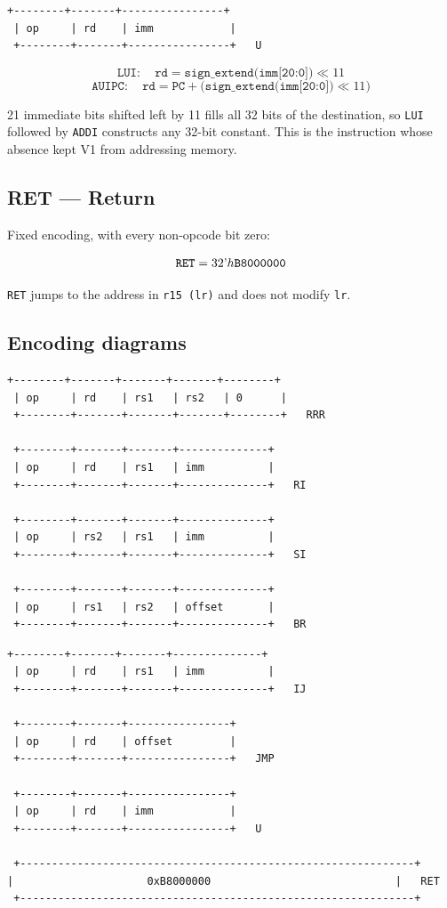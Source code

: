 \documentclass[11pt,a4paper]{article}
\begin{document}
\begin{lstlisting}[style=Bits]
 +--------+-------+----------------+
 | op     | rd    | imm            |
 +--------+-------+----------------+   U
\end{lstlisting}

\[
\texttt{LUI}: \quad \texttt{rd} = \texttt{sign\_extend(imm[20:0])} \ll 11
\]
\[
\texttt{AUIPC}: \quad \texttt{rd} = \texttt{PC} + \big(\texttt{sign\_extend(imm[20:0])} \ll 11\big)
\]

21 immediate bits shifted left by 11 fills all 32 bits of the destination, so
\texttt{LUI} followed by \texttt{ADDI} constructs any 32-bit constant. This is
the instruction whose absence kept V1 from addressing memory.

\subsection{RET --- Return}

Fixed encoding, with every non-opcode bit zero:

\[
\texttt{RET} = 32\textrm{\textquoteright}h\texttt{B8000000}
\]

\texttt{RET} jumps to the address in \texttt{r15 (lr)} and does not modify
\texttt{lr}.

\newpage

\subsection{Encoding diagrams}

\begin{lstlisting}[style=Bits]
 +--------+-------+-------+-------+--------+
 | op     | rd    | rs1   | rs2   | 0      |
 +--------+-------+-------+-------+--------+   RRR

 +--------+-------+-------+--------------+
 | op     | rd    | rs1   | imm          |
 +--------+-------+-------+--------------+   RI

 +--------+-------+-------+--------------+
 | op     | rs2   | rs1   | imm          |
 +--------+-------+-------+--------------+   SI

 +--------+-------+-------+--------------+
 | op     | rs1   | rs2   | offset       |
 +--------+-------+-------+--------------+   BR
\end{lstlisting}

\begin{lstlisting}[style=Bits]
 +--------+-------+-------+--------------+
 | op     | rd    | rs1   | imm          |
 +--------+-------+-------+--------------+   IJ

 +--------+-------+----------------+
 | op     | rd    | offset         |
 +--------+-------+----------------+   JMP

 +--------+-------+----------------+
 | op     | rd    | imm            |
 +--------+-------+----------------+   U

 +--------------------------------------------------------------+
|                     0xB8000000                             |   RET
 +--------------------------------------------------------------+
\end{lstlisting}
\end{document}
